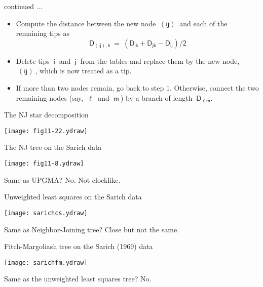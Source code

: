 \documentclass[bluish,slideColor,colorBG,pdf]{prosper}
\begin{document}
\begin{slide}[Replace]{continued ... }

\begin{itemize}
\item Compute the distance between the new node $~\mathsf{(ij)}~$ and each of the
remaining tips as
\[
\mathsf{D_{(ij),k}\  = \ \left(D_{ik} + D_{jk} - D_{ij} \right) \Big/ 2}
\]
\item Delete tips $~\mathsf{i}~$ and $~\mathsf{j}~$ from the tables and replace them by
the new node, $~\mathsf{(ij)}~$, which is now treated as a tip.
\item If more than two nodes remain, go back to step 1.  Otherwise,
connect the two remaining nodes (say, $~\mathsf{\ell}~$ and $~\mathsf{m}~$) by a branch of length $~\mathsf{D_{\ell m}}$.
\end{itemize}

\end{slide}

\begin{slide}[Replace]{The NJ star decomposition}

\centerline{\texttt{[image: fig11-22.ydraw]}}

\end{slide}

\begin{slide}[Replace]{The NJ tree on the Sarich data}

\centerline{\texttt{[image: fig11-8.ydraw]}}

Same as UPGMA? No.  Not clocklike.

\end{slide}

\begin{slide}[Replace]{Unweighted least squares on the Sarich data}

\centerline{\texttt{[image: sarichcs.ydraw]}}

Same as Neighbor-Joining tree?  Close but not the same.

\end{slide}

\begin{slide}[Replace]{Fitch-Margoliash tree on the Sarich (1969) data}

\centerline{\texttt{[image: sarichfm.ydraw]}}

Same as the unweighted least squares tree?  No.

\end{slide}
\end{document}
